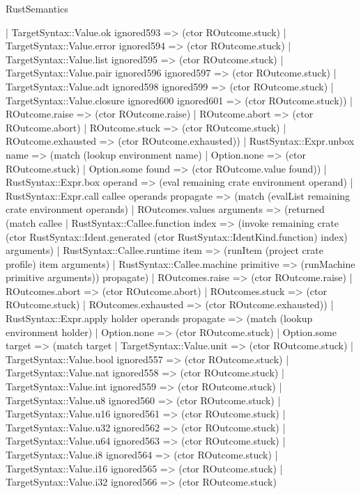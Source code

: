 \begin{lexlean}{RustSemantics}
\begin{semanticmodule}
{          | TargetSyntax::Value.ok ignored593 => (ctor ROutcome.stuck)
          | TargetSyntax::Value.error ignored594 => (ctor ROutcome.stuck)
          | TargetSyntax::Value.list ignored595 => (ctor ROutcome.stuck)
          | TargetSyntax::Value.pair ignored596 ignored597 => (ctor ROutcome.stuck)
          | TargetSyntax::Value.adt ignored598 ignored599 => (ctor ROutcome.stuck)
          | TargetSyntax::Value.closure ignored600 ignored601 => (ctor ROutcome.stuck))
        | ROutcome.raise => (ctor ROutcome.raise)
        | ROutcome.abort => (ctor ROutcome.abort)
        | ROutcome.stuck => (ctor ROutcome.stuck)
        | ROutcome.exhausted => (ctor ROutcome.exhausted))
      | RustSyntax::Expr.unbox name => (match (lookup environment name)
        | Option.none => (ctor ROutcome.stuck)
        | Option.some found => (ctor ROutcome.value found))
      | RustSyntax::Expr.box operand => (eval remaining crate environment operand)
      | RustSyntax::Expr.call callee operands propagate => (match (evalList remaining crate environment operands)
        | ROutcomes.values arguments => (returned (match callee
          | RustSyntax::Callee.function index => (invoke remaining crate (ctor RustSyntax::Ident.generated (ctor RustSyntax::IdentKind.function) index) arguments)
          | RustSyntax::Callee.runtime item => (runItem (project crate profile) item arguments)
          | RustSyntax::Callee.machine primitive => (runMachine primitive arguments)) propagate)
        | ROutcomes.raise => (ctor ROutcome.raise)
        | ROutcomes.abort => (ctor ROutcome.abort)
        | ROutcomes.stuck => (ctor ROutcome.stuck)
        | ROutcomes.exhausted => (ctor ROutcome.exhausted))
      | RustSyntax::Expr.apply holder operands propagate => (match (lookup environment holder)
        | Option.none => (ctor ROutcome.stuck)
        | Option.some target => (match target
          | TargetSyntax::Value.unit => (ctor ROutcome.stuck)
          | TargetSyntax::Value.bool ignored557 => (ctor ROutcome.stuck)
          | TargetSyntax::Value.nat ignored558 => (ctor ROutcome.stuck)
          | TargetSyntax::Value.int ignored559 => (ctor ROutcome.stuck)
          | TargetSyntax::Value.u8 ignored560 => (ctor ROutcome.stuck)
          | TargetSyntax::Value.u16 ignored561 => (ctor ROutcome.stuck)
          | TargetSyntax::Value.u32 ignored562 => (ctor ROutcome.stuck)
          | TargetSyntax::Value.u64 ignored563 => (ctor ROutcome.stuck)
          | TargetSyntax::Value.i8 ignored564 => (ctor ROutcome.stuck)
          | TargetSyntax::Value.i16 ignored565 => (ctor ROutcome.stuck)
          | TargetSyntax::Value.i32 ignored566 => (ctor ROutcome.stuck)
}
\end{semanticmodule}
\end{lexlean}

